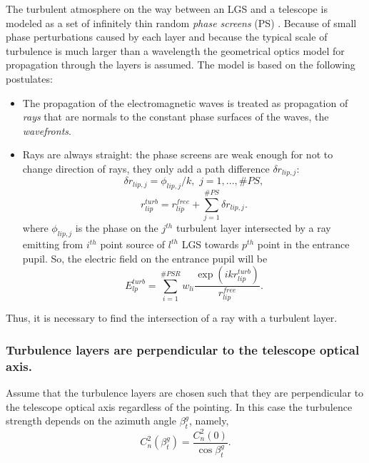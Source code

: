 The turbulent atmosphere on the way between an LGS and a telescope is modeled
as a set of infinitely thin random \emph{phase screens} (PS)
. Because of small phase perturbations caused by each
layer and because the typical scale of turbulence is much larger than a
wavelength the geometrical optics model for propagation through the layers is
assumed. The model is based on the following postulates:
\begin{itemize}
	\item The propagation of the electromagnetic waves is treated as propagation
	of \emph{rays} that are normals to the constant phase surfaces of the waves,
	the \emph{wavefronts}.  
	\item Rays are always straight: the phase screens are weak enough for not
	to change direction of rays, they only add a path difference
	$\delta r_{lip,j}$:
	\begin{equation} \label{eq:path-diff}
		\delta r_{lip,j} = \phi_{lip,j}/k, \,\, j = 1,...,\#PS,
	\end{equation}
	$$ r_{lip}^{turb} = r_{lip}^{free} + \sum_{j=1}^{\#PS} \delta r_{lip,j}. $$
	where $\phi_{lip,j}$ is the phase on the $j^{th}$ turbulent layer
	intersected by a ray emitting from $i^{th}$ point source of $l^{th}$ LGS
	towards $p^{th}$ point in the entrance pupil. So, the electric field
	on the entrance pupil will be
	\begin{equation} \label{eq:spherical-superposition-turb}
		E^{turb}_{lp} =
		\sum_{i=1}^{\#PSR} w_{li}
		\frac{\exp(i k r_{lip}^{turb})}{r_{lip}^{free}}.
	\end{equation}
\end{itemize}

Thus, it is necessary to find the intersection of a ray with a turbulent layer.

\subsubsection{Turbulence layers are perpendicular to the telescope optical
axis.}
\label{subsubsec:perp-turb}

Assume that the turbulence layers are chosen such that they are perpendicular
to the telescope optical axis regardless of the pointing.
In this case the turbulence strength depends on the azimuth angle
$\beta_{t}^{g}$, namely,
\begin{equation} \label{eq:turb-vs-beta}
	C_{n}^{2} (\beta_{t}^{g}) = \frac{C_{n}^{2}(0)} {\cos \beta_{t}^{g}}.
\end{equation}

